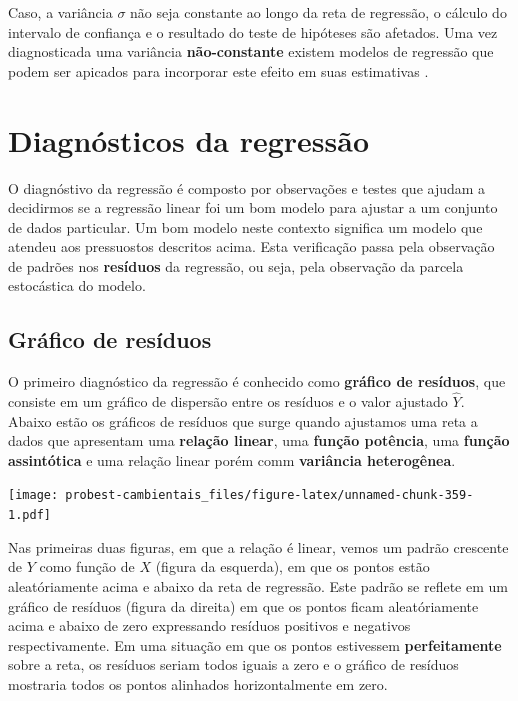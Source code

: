 \documentclass[
]{book}
\begin{document}
Caso, a variância \(\sigma\) não seja constante ao longo da reta de regressão, o cálculo do intervalo de confiança e o resultado do teste de hipóteses são afetados. Uma vez diagnosticada uma variância \textbf{não-constante} existem modelos de regressão que podem ser apicados para incorporar este efeito em suas estimativas \citep{zuur2009mixed}.

\hypertarget{diagnuxf3sticos-da-regressuxe3o}{%
\section{Diagnósticos da regressão}\label{diagnuxf3sticos-da-regressuxe3o}}

O diagnóstivo da regressão é composto por observações e testes que ajudam a decidirmos se a regressão linear foi um bom modelo para ajustar a um conjunto de dados particular. Um bom modelo neste contexto significa um modelo que atendeu aos pressuostos descritos acima. Esta verificação passa pela observação de padrões nos \textbf{resíduos} da regressão, ou seja, pela observação da parcela estocástica do modelo.

\hypertarget{gruxe1fico-de-resuxedduos}{%
\subsection{Gráfico de resíduos}\label{gruxe1fico-de-resuxedduos}}

O primeiro diagnóstico da regressão é conhecido como \textbf{gráfico de resíduos}, que consiste em um gráfico de dispersão entre os resíduos e o valor ajustado \(\hat{Y}\). Abaixo estão os gráficos de resíduos que surge quando ajustamos uma reta a dados que apresentam uma \textbf{relação linear}, uma \textbf{função potência}, uma \textbf{função assintótica} e uma relação linear porém comm \textbf{variância heterogênea}.

\texttt{[image: probest-cambientais\_files/figure-latex/unnamed-chunk-359-1.pdf]}

Nas primeiras duas figuras, em que a relação é linear, vemos um padrão crescente de \(Y\) como função de \(X\) (figura da esquerda), em que os pontos estão aleatóriamente acima e abaixo da reta de regressão. Este padrão se reflete em um gráfico de resíduos (figura da direita) em que os pontos ficam aleatóriamente acima e abaixo de zero expressando resíduos positivos e negativos respectivamente. Em uma situação em que os pontos estivessem \textbf{perfeitamente} sobre a reta, os resíduos seriam todos iguais a zero e o gráfico de resíduos mostraria todos os pontos alinhados horizontalmente em zero.
\end{document}
